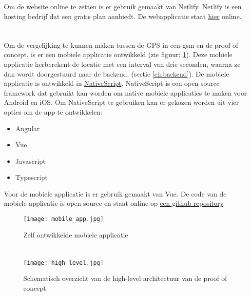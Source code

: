 \subsection{}
Om de website online te zetten is er gebruik gemaakt van Netlify. \href{https://www.netlify.com/}{Netlify} is een hosting bedrijf dat een gratis plan aanbiedt. De webapplicatie staat \href{https://indy-bap-frontend.netlify.com/}{\underline{hier}} online.

\section{}
\label{ch:mobileapp}
Om de vergelijking te kunnen maken tussen de GPS in een gsm en de proof of concept, is er een mobiele applicatie ontwikkeld (zie figuur: \ref{fig:mobileapp}). Deze mobiele applicatie herberekent de locatie met een interval van drie seconden, waarna ze dan wordt doorgestuurd naar de backend. (sectie \ref{ch:backend}). De mobiele applicatie is ontwikkeld in \href{https://www.nativescript.org/}{NativeScript}. NativeScript is een open source framework dat gebruikt kan worden om native mobiele applicaties te maken voor Android en iOS. Om NativeScript te gebruiken kan er gekozen worden uit vier opties om de app te ontwikkelen:
\begin{itemize}
	\item Angular
	\item Vue
	\item Javascript
	\item Typescript
\end{itemize}
Voor de mobiele applicatie is er gebruik gemaakt van Vue. De code van de mobiele applicatie is open source en staat online op \underline{\href{https://github.com/IndyVC/bap-gsmtracker}{een github repository}}. 
\begin{figure}
	\texttt{[image: mobile\_app.jpg]}
	\caption{Zelf ontwikkelde mobiele applicatie}
	\label{fig:mobileapp}
\end{figure}
\section{}
\label{ch:architectuur}
\begin{figure}
	\texttt{[image: high\_level.jpg]}
	\caption{Schematisch overzicht van de high-level architectuur van de proof of concept}
	\label{fig:architectuur}
\end{figure}